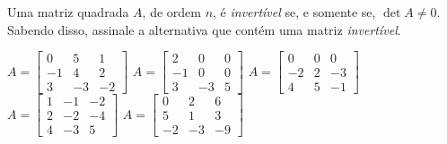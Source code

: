 Uma matriz quadrada $A$, de ordem $n$, é {\it invertível} se, e somente se, $\det A\neq 0$. Sabendo disso, assinale a alternativa que contém uma matriz {\it invertível}.

$A = \left[ \begin{array}{ccc} 0& 5 & 1\\ -1& 4 & 2\\ 3 & -3 & -2 \end{array} \right]$
$A = \left[ \begin{array}{ccc}  2 &  0 & 0\\  -1 &  0 &  0\\  3 & -3 &  5 \end{array} \right]$
$A = \left[ \begin{array}{ccc} 0 & 0 & 0\\ -2 & 2 & -3\\ 4 &5 & -1 \end{array} \right]$
$A = \left[ \begin{array}{ccc} 1 & -1 & -2\\ 2 & -2 & -4\\ 4 &-3 & 5 \end{array} \right]$
$A = \left[ \begin{array}{ccc}  0 &  2 &  6\\  5 &  1 &  3\\ -2 & -3 & -9 \end{array} \right]$








